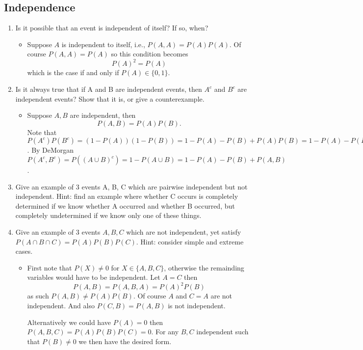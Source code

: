 \documentclass{article}
\begin{document}
\subsection{Independence}
\begin{enumerate}
	\item Is it possible that an event is independent of itself? If so, when?
		\begin{itemize}
			\item Suppose $A$ is independent to itself, i.e., $P(A, A) = P(A)P(A)$. Of course $P(A, A) = P(A)$ so this condition becomes
			$$
			P(A)^2 = P(A)
			$$
			which is the case if and only if $P(A) \in \{0, 1\}$.
		\end{itemize}
	\item Is it always true that if A and B are independent events, then $A^c$ and $B^c$ are independent events? Show that it is, or give a counterexample.
		\begin{itemize}
			\item Suppose $A, B$ are independent, then
			$$
			P(A, B) = P(A)P(B).
			$$
			Note that $P(A^c)P(B^c) = (1 - P(A))(1 - P(B)) = 1 - P(A) - P(B) + P(A)P(B) = 1 - P(A) - P(B) + P(A, B)$. By DeMorgan $P(A^c, B^c) = P((A \cup B)^c) = 1 - P(A \cup B) = 1 - P(A) - P(B) + P(A, B)$.
		\end{itemize}
	\item Give an example of 3 events A, B, C which are pairwise independent but not independent. Hint: find an example where whether C occurs is completely determined if we know whether A occurred and whether B occurred, but completely undetermined if we know only one of these things.
	\item Give an example of $3$ events $A, B, C$ which are not independent, yet satisfy $P(A \cap B \cap C) = P(A)P(B)P(C)$. Hint: consider simple and extreme cases.
		\begin{itemize}
			\item First note that $P(X) \neq 0$ for $X \in \{A, B, C\}$, otherwise the remainding variables would have to be independent. Let $A = C$ then
			$$
			P(A, B) = P(A, B, A) = P(A)^2 P(B)
			$$
			as such $P(A, B) \neq P(A)P(B)$. Of course $A$ and $C = A$ are not independent. And also $P(C, B) = P(A, B)$ is not independent.

			Alternatively we could have $P(A) = 0$ then $P(A, B, C) = P(A)P(B)P(C) = 0$. For any $B, C$ independent such that $P(B) \neq 0$ we then have the desired form.
		\end{itemize}
\end{enumerate}
\end{document}
